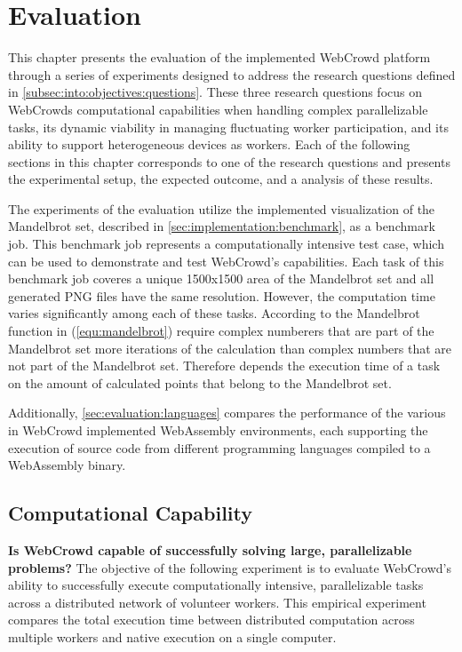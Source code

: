 \chapter{Evaluation}
\label{ch:evaluation}
This chapter presents the evaluation of the implemented WebCrowd platform through a series of experiments designed to address the research questions defined in \autoref{subsec:into:objectives:questions}. These three research questions focus on WebCrowds computational capabilities when handling complex parallelizable tasks, its dynamic viability in managing fluctuating worker participation, and its ability to support heterogeneous devices as workers. Each of the following sections in this chapter corresponds to one of the research questions and presents the experimental setup, the expected outcome, and a analysis of these results.

The experiments of the evaluation utilize the implemented visualization of the Mandelbrot set, described in \autoref{sec:implementation:benchmark}, as a benchmark job. This benchmark job represents a computationally intensive test case, which can be used to demonstrate and test WebCrowd's capabilities. Each task of this benchmark job coveres a unique 1500x1500 area of the Mandelbrot set and all generated \ac{PNG} files have the same resolution. However, the computation time varies significantly among each of these tasks. According to the Mandelbrot function in (\ref{equ:mandelbrot}) require complex numberers that are part of the Mandelbrot set more iterations of the calculation than complex numbers that are not part of the Mandelbrot set. Therefore depends the execution time of a task on the amount of calculated points that belong to the Mandelbrot set.

Additionally, \autoref{sec:evaluation:languages} compares the performance of the various in WebCrowd implemented WebAssembly environments, each supporting the execution of source code from different programming languages compiled to a WebAssembly binary.

\section{Computational Capability}
\textbf{Is WebCrowd capable of successfully solving large, parallelizable problems?} 
\newline
The objective of the following experiment is to evaluate WebCrowd's ability to successfully execute computationally intensive, parallelizable tasks across a distributed network of volunteer workers. This empirical experiment compares the total execution time between distributed computation across multiple workers and native execution on a single computer.

